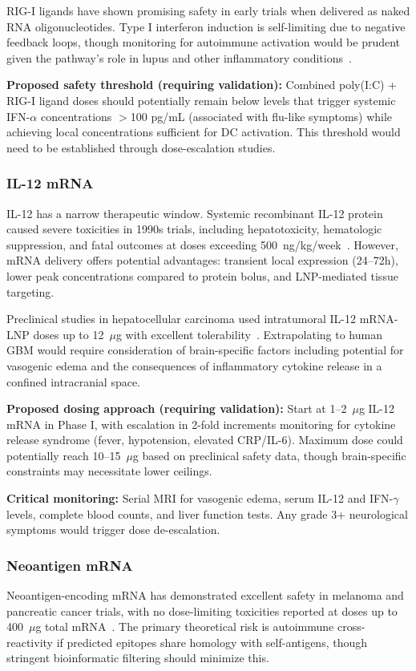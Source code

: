 \documentclass[12pt]{article}
\begin{document}
RIG-I ligands have shown promising safety in early trials when delivered as naked RNA oligonucleotides. Type I interferon induction is self-limiting due to negative feedback loops, though monitoring for autoimmune activation would be prudent given the pathway's role in lupus and other inflammatory conditions~\citep{jiang2023}.

\textbf{Proposed safety threshold (requiring validation):} Combined poly(I:C) + RIG-I ligand doses should potentially remain below levels that trigger systemic IFN-$\alpha$ concentrations $>$100 pg/mL (associated with flu-like symptoms) while achieving local concentrations sufficient for DC activation. This threshold would need to be established through dose-escalation studies.

\subsubsection{IL-12 mRNA}
IL-12 has a narrow therapeutic window. Systemic recombinant IL-12 protein caused severe toxicities in 1990s trials, including hepatotoxicity, hematologic suppression, and fatal outcomes at doses exceeding 500~ng/kg/week~\citep{lai2018}. However, mRNA delivery offers potential advantages: transient local expression (24--72h), lower peak concentrations compared to protein bolus, and LNP-mediated tissue targeting.

Preclinical studies in hepatocellular carcinoma used intratumoral IL-12 mRNA-LNP doses up to 12~$\mu$g with excellent tolerability~\citep{aunins2025,lai2018}. Extrapolating to human GBM would require consideration of brain-specific factors including potential for vasogenic edema and the consequences of inflammatory cytokine release in a confined intracranial space.

\textbf{Proposed dosing approach (requiring validation):} Start at 1--2~$\mu$g IL-12 mRNA in Phase I, with escalation in 2-fold increments monitoring for cytokine release syndrome (fever, hypotension, elevated CRP/IL-6). Maximum dose could potentially reach 10--15~$\mu$g based on preclinical safety data, though brain-specific constraints may necessitate lower ceilings.

\textbf{Critical monitoring:} Serial MRI for vasogenic edema, serum IL-12 and IFN-$\gamma$ levels, complete blood counts, and liver function tests. Any grade 3+ neurological symptoms would trigger dose de-escalation.

\subsubsection{Neoantigen mRNA}
Neoantigen-encoding mRNA has demonstrated excellent safety in melanoma and pancreatic cancer trials, with no dose-limiting toxicities reported at doses up to 400~$\mu$g total mRNA~\citep{hilf2024,wang2025}. The primary theoretical risk is autoimmune cross-reactivity if predicted epitopes share homology with self-antigens, though stringent bioinformatic filtering should minimize this.
\end{document}
